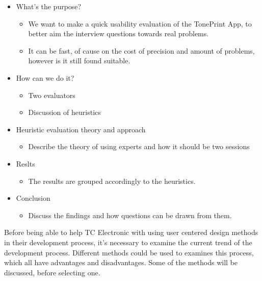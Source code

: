 \begin{itemize}
	\item What’s the purpose?
		\begin{itemize}
		\item We want to make a quick usability evaluation of the TonePrint App, to better aim the interview questions towards real problems.
		\item It can be fast, of cause on the cost of precision and amount of problems, however is it still found suitable.
		\end{itemize}
	\item How can we do it?
		\begin{itemize}
		\item Two evaluators
		\item Discussion of heuristics
		\end{itemize}
	\item Heuristic evaluation theory and approach
		\begin{itemize}
		\item Describe the theory of using experts and how it should be two sessions
		\end{itemize}
	\item Reslts
		\begin{itemize}
		\item The results are grouped accordingly to the heuristics.
		\end{itemize}
	\item Conclusion
		\begin{itemize}
		\item Discuss the findings and how questions can be drawn from them.
		\end{itemize}
\end{itemize}

Before being able to help TC Electronic with using user centered design methods in their development process, it's necessary to examine the current trend of the development process. Different methods could be used to examines this process, which all have advantages and disadvantages. Some of the methods will be discussed, before selecting one.

